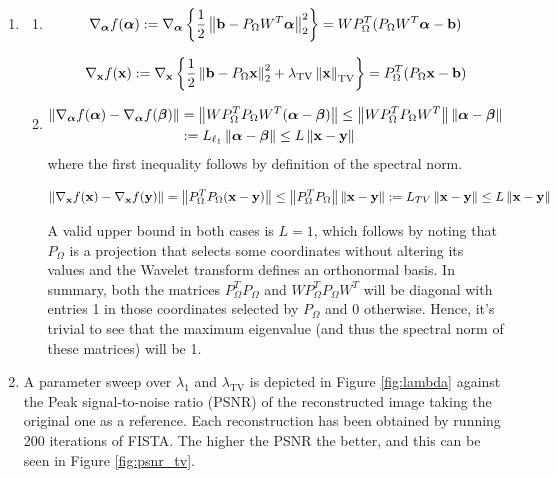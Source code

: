 \documentclass{article}
\begin{document}
\begin{enumerate}[label=2.\arabic*]
    \item 
    \begin{enumerate}[label=\alph*)]
        \item 
        \begin{align}
            \nabla_{\boldsymbol{\alpha}}f(\boldsymbol{\alpha}) :=\nabla_{\boldsymbol{\alpha}} \left\lbrace \frac{1}{2}\left\lVert\mathbf{b} - P_{\Omega} W^T \boldsymbol{\alpha}\right\rVert_2^2 \right\rbrace = W P_{\Omega}^T (P_{\Omega} W^T \boldsymbol{\alpha} - \mathbf{b})
        \end{align}
        
        \begin{align}
            \nabla_{\mathbf{x}}f(\mathbf{x}) := \nabla_{\mathbf{x}} \left\lbrace \frac{1}{2}\left\lVert\mathbf{b} - P_{\Omega} \mathbf{x}\right\rVert_2^2 + \lambda_{\text{TV}}\left\lVert\mathbf{x}\right\rVert_{\text{TV}} \right\rbrace = P_{\Omega}^T (P_{\Omega} \mathbf{x} - \mathbf{b}) 
        \end{align}
        \item 
        \begin{align}
            \left\lVert\nabla_{\boldsymbol{\alpha}}f(\boldsymbol{\alpha}) - \nabla_{\boldsymbol{\alpha}}f(\boldsymbol{\beta})\right\rVert &= \left\lVert W P_{\Omega}^T P_{\Omega} W^T(\boldsymbol{\alpha} - \boldsymbol{\beta})\right\rVert \leq \left\lVert W P_{\Omega}^T P_{\Omega} W^T\right\rVert \left\lVert\boldsymbol{\alpha} - \boldsymbol{\beta}\right\rVert \\
            &:= L_{\ell_1} \left\lVert\boldsymbol{\alpha} - \boldsymbol{\beta}\right\rVert \leq L \left\lVert\mathbf{x} - \mathbf{y}\right\rVert
        \end{align}
        where the first inequality follows by definition of the spectral norm. 
        
        \begin{align}
            \left\lVert\nabla_{\mathbf{x}} f(\mathbf{x}) - \nabla_{\mathbf{x}} f(\mathbf{y})\right\rVert = \left\lVert P_{\Omega} ^TP_{\Omega} (\mathbf{x} - \mathbf{y})\right\rVert \leq \left\lVert P_{\Omega} ^TP_{\Omega}\right\rVert\left\lVert\mathbf{x} - \mathbf{y}\right\rVert := L_{TV}\left\lVert\mathbf{x} - \mathbf{y}\right\rVert \leq L \left\lVert\mathbf{x} - \mathbf{y}\right\rVert
        \end{align}
    
    A valid upper bound in both cases is $L=1$, which follows by noting that $P_{\Omega}$ is a projection that selects some coordinates without altering its values and the Wavelet transform defines an orthonormal basis. In summary, both the matrices $P_{\Omega}^T P_{\Omega}$ and $W P_{\Omega}^T P_{\Omega} W^T$ will be diagonal with entries 1 in those coordinates selected by $P_{\Omega}$ and 0 otherwise. Hence, it's trivial to see that the maximum eigenvalue (and thus the spectral norm of these matrices) will be 1.
    \end{enumerate}
    \item 
    A parameter sweep over $\lambda_1$ and $\lambda_{\text{TV}}$ is depicted in Figure \ref{fig:lambda} against the Peak signal-to-noise ratio (PSNR) of the reconstructed image taking the original one as a reference. Each reconstruction has been obtained by running 200 iterations of FISTA. The higher the PSNR the better, and this can be seen in Figure \ref{fig:psnr_tv}.
    

\end{enumerate}
\end{document}
